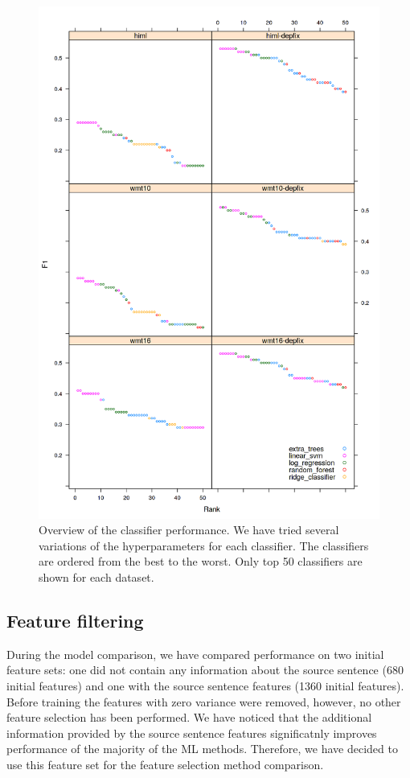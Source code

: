 \begin{figure}
\centering
  \includegraphics[scale=0.7]{wf-class}
  \caption{
    Overview of the classifier performance.
We have tried several variations of the hyperparameters
for each classifier. The classifiers are ordered from the best to the worst. Only top 50 classifiers
are shown for each dataset.
}
  \label{wf-draft}
\end{figure}

\subsection{Feature filtering}

During the model comparison, we have compared performance on two initial feature sets:
one did not contain any information about the source sentence (\tilda{}680 initial features)
and one with the source sentence features (\tilda{}1360 initial features). Before training
the features with zero variance were removed, however, no other feature selection has been
performed. We have noticed that the additional information provided by the source sentence features
significatnly improves performance of the majority of the ML methods. Therefore, we have decided
to use this feature set for the feature selection method comparison.

